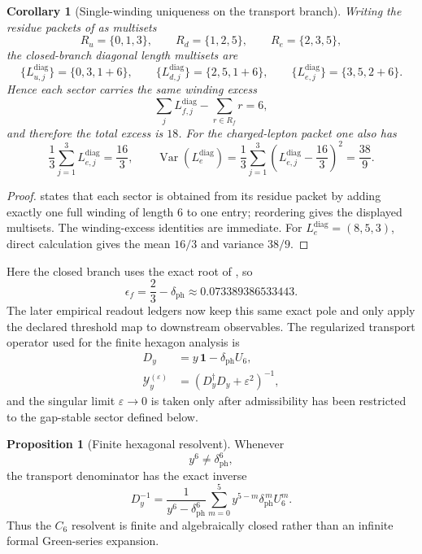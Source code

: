 \documentclass[11pt,a4paper]{article}
\newtheorem{corollary}[theorem]{Corollary}
\theoremstyle{definition}
\newtheorem{proposition}[theorem]{Proposition}
\theoremstyle{remark}
\begin{document}
\begin{corollary}[Single-winding uniqueness on the transport branch]
\label{cor:single-winding-transport}
Writing the residue packets of  as multisets
\[
R_u=\{0,1,3\},
\qquad
R_d=\{1,2,5\},
\qquad
R_e=\{2,3,5\},
\]
the closed-branch diagonal length multisets are
\[
\{L_{u,j}^{\mathrm{diag}}\}=\{0,3,1+6\},
\qquad
\{L_{d,j}^{\mathrm{diag}}\}=\{2,5,1+6\},
\qquad
\{L_{e,j}^{\mathrm{diag}}\}=\{3,5,2+6\}.
\]
Hence each sector carries the same winding excess
\[
\sum_j L_{f,j}^{\mathrm{diag}}-\sum_{r\in R_f}r=6,
\]
and therefore the total excess is $18$. For the charged-lepton packet one also has
\[
\frac{1}{3}\sum_{j=1}^3 L_{e,j}^{\mathrm{diag}}=\frac{16}{3},
\qquad
\operatorname{Var}(L_e^{\mathrm{diag}})
=
\frac{1}{3}\sum_{j=1}^3\left(L_{e,j}^{\mathrm{diag}}-\frac{16}{3}\right)^2
=
\frac{38}{9}.
\]
\end{corollary}

\begin{proof}
 states that each sector is obtained from its residue packet by
adding exactly one full winding of length $6$ to one entry; reordering gives the displayed
multisets. The winding-excess identities are immediate. For $L_e^{\mathrm{diag}}=(8,5,3)$, direct
calculation gives the mean $16/3$ and variance $38/9$.
\end{proof}

Here the closed branch uses the exact root of , so
\[
\epsilon_f
=
\frac23-\delta_{\mathrm{ph}}
\approx \num{0.073389386533443}.
\]
The later empirical readout ledgers now keep this same exact pole and only apply the declared threshold
map to downstream observables. The regularized transport operator used for the finite
hexagon analysis is
\begin{equation}
\label{eq:yukawa-kernel}
\begin{aligned}
D_y&=y\,\mathbf 1-\delta_{\mathrm{ph}}U_6,\\
\mathcal Y_y^{(\varepsilon)}&=(D_y^\dagger D_y+\varepsilon^2)^{-1},
\end{aligned}
\end{equation}
and the singular limit $\varepsilon\to0$ is taken only after admissibility has been restricted to the gap-stable sector defined below.

\begin{proposition}[Finite hexagonal resolvent]
\label{prop:finite-hexagonal-resolvent}
Whenever
\[
y^6\neq \delta_{\mathrm{ph}}^6,
\]
the transport denominator has the exact inverse
\begin{equation}
\label{eq:finite-hexagonal-resolvent}
D_y^{-1}
=
\frac{1}{y^6-\delta_{\mathrm{ph}}^6}
\sum_{m=0}^{5}y^{5-m}\delta_{\mathrm{ph}}^{\,m}U_6^m.
\end{equation}
Thus the $C_6$ resolvent is finite and algebraically closed rather than an infinite formal Green-series expansion.
\end{proposition}
\end{document}
